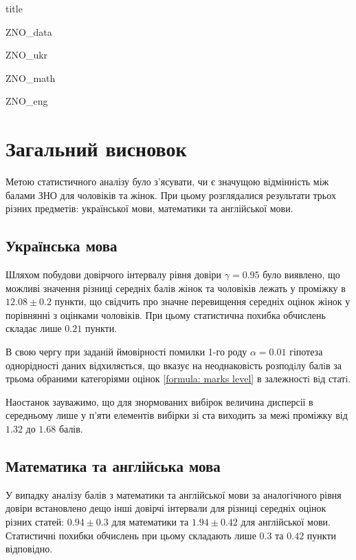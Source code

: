 \documentclass[a4paper,14pt]{extarticle} %
\numberwithin{equation}{section}
\begin{document}
{title}

\tableofcontents

\newpage
{ZNO_data}

\newpage
{ZNO_ukr}

\newpage
{ZNO_math}

\newpage
{ZNO_eng}

\newpage
\section*{Загальний висновок}

Метою статистичного аналізу було з'ясувати, чи є значущою відмінність між балами ЗНО для чоловіків 
та жінок. При цьому розглядалися результати трьох різних предметів: української мови, математики та 
англійської мови.

\subsection*{Українська мова}

Шляхом побудови довірчого інтервалу рівня довіри $\gamma=0.95$ було виявлено, що можливі значення різниці середніх балів 
жінок та чоловіків лежать у проміжку в $12.08\pm 0.2$ пункти, що свідчить про значне перевищення середніх
оцінок жінок у порівнянні з оцінками чоловіків. При цьому статистична похибка обчислень складає лише $0.21$ 
пункти. 

В свою чергу при заданій ймовірності помилки 1-го роду $\alpha=0.01$ гіпотеза однорідності даних відхиляється, 
що вказує на неоднаковість розподiлу балiв за трьома обраними категоріями оцінок \eqref{formula: marks level} 
в залежностi вiд статi.

Наостанок зауважимо, що для знормованих вибірок величина дисперсії в середньому лише у п'яти 
елементів вибірки зі ста виходить за межі проміжку від $1.32$ до $1.68$ балів.

\subsection*{Математика та англійська мова}

У випадку аналізу балів з математики та англійської мови за аналогічного рівня довіри встановлено дещо інші 
довірчі інтервали для різниці середніх оцінок різних статей: $0.94\pm 0.3$ для математики та $1.94\pm 0.42$ 
для англійської мови. Статистичні похибки обчислень при цьому складають лише $0.3$ та $0.42$ пункти відповідно. 
\end{document}
